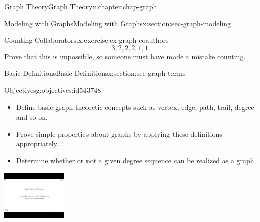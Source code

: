 \documentclass[oneside,10pt,]{book}
\numberwithin{equation}{section}
\newlength{\qrsize}
\newlength{\previewwidth}
\begin{document}
\begin{chapterptx}{Graph Theory}{}{Graph Theory}{}{}{x:chapter:chap-graph}
\begin{sectionptx}{Modeling with Graphs}{}{Modeling with Graphs}{}{}{x:section:sec-graph-modeling}
\begin{inlineexercise}{Counting Collaborators.}{x:exercise:ex-graph-coauthors}
\begin{equation*}
3,2,2,2,1,1\text{.}
\end{equation*}
Prove that this is impossible, so someone must have made a mistake counting.%
\end{inlineexercise}%
\end{sectionptx}
%
%
\typeout{************************************************}
\typeout{************************************************}
%
\begin{sectionptx}{Basic Definitions}{}{Basic Definitions}{}{}{x:section:sec-graph-terms}
\begin{objectives}{Objectives}{g:objectives:id543748}
%
\begin{itemize}[label=\textbullet]
\item{}Define basic graph theoretic concepts such as vertex, edge, path, trail, degree and so on.%
\item{}Prove simple properties about graphs by applying these definitions appropriately.%
\item{}Determine whether or not a given degree sequence can be realized as a graph.%
\end{itemize}
\end{objectives}
\begin{sidebyside}{1}{0}{0}{0}%
\begin{sbspanel}{1}%
\setlength{\qrsize}{9em}
\setlength{\previewwidth}{\linewidth}
\addtolength{\previewwidth}{-\qrsize}
\begin{tcbraster}[raster columns=2, raster column skip=1pt, raster halign=center, raster force size=false, raster left skip=0pt, raster right skip=0pt]%
\begin{tcolorbox}[previewstyle, width=\previewwidth]%
\includegraphics[width=0.80\linewidth,height=\qrsize,keepaspectratio]{images/video-graph-theory-defs.jpg}%

\end{tcolorbox}
\end{tcbraster}
\end{sbspanel}
\end{sidebyside}
\end{sectionptx}
\end{chapterptx}
\end{document}
